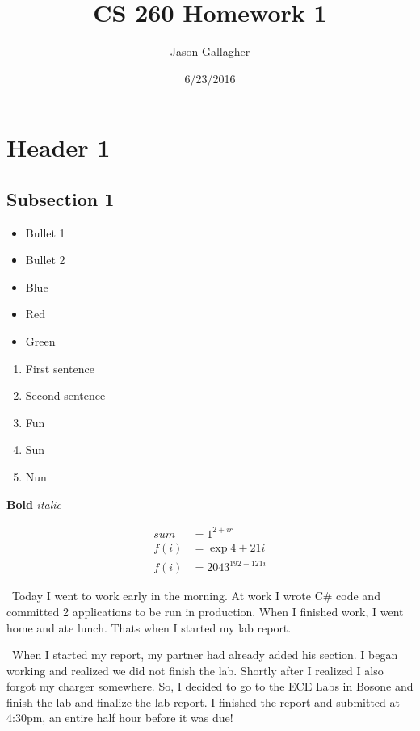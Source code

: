 \documentclass{article}
\begin{document}
		\title{CS 260 Homework 1}
		\date{6/23/2016}
		\author{Jason Gallagher}
		\maketitle

		\section{Header 1}
			\subsection{Subsection 1}
				\begin{itemize}
					\item Bullet 1
					\item Bullet 2
					\item Blue
					\item Red
					\item Green
				\end{itemize}
			\begin{enumerate}
				\item First sentence
				\item Second sentence
				\item Fun
				\item Sun
				\item Nun
			\end{enumerate}
		\textbf{Bold}
		\textit{italic}



	\begin{align}
			sum&=1^{2+ir}\\
			f(i)&=\exp {4+21i}\\
			f(i)&={2043}^{192+121i}
	\end{align}



		\ Today I went to work early in the morning. At work I wrote C\# code and committed 2 applications to be run in production. When I finished work, I went home and ate lunch. Thats when I started my lab report.

\ When I started my report, my partner had already added his section. I began working and realized we did not finish the lab. Shortly after I realized I also forgot my charger somewhere. So, I decided to go to the ECE Labs in Bosone and finish the lab and finalize the lab report. I finished the report and submitted at 4:30pm, an entire half hour before it was due!\\
\end{document}
